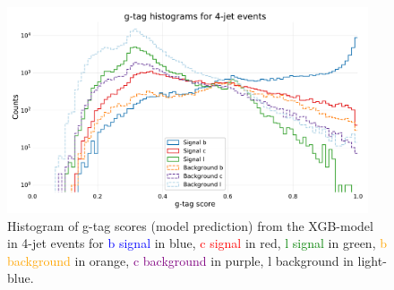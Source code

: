 \begin{figure}
  \includegraphics[width=0.95\textwidth, trim=10 10 10 40, clip]{figures/quarks/gtag-histogram-sigbkg-down_sample=1.00-ML_vars=vertex-selection=b-ejet_min=4-n_iter_RS_lgb=99-n_iter_RS_xgb=9-cdot_cut=0.90-version=19-njet=4.pdf}
  \caption[g-tag scores in 4-jet events for signal and background]
          {Histogram of g-tag scores (model prediction) from the XGB-model in 4-jet events for \textcolor{blue}{b signal} in blue, \textcolor{red}{c signal} in red, \textcolor{green}{l signal} in green, \textcolor{orange}{b background} in orange, \textcolor{purple}{c background} in purple, \textcolor{light-blue}{l background} in light-blue.
          } 
  \label{fig:q:gtag_scores_4j_sig_bkg}
\end{figure}





